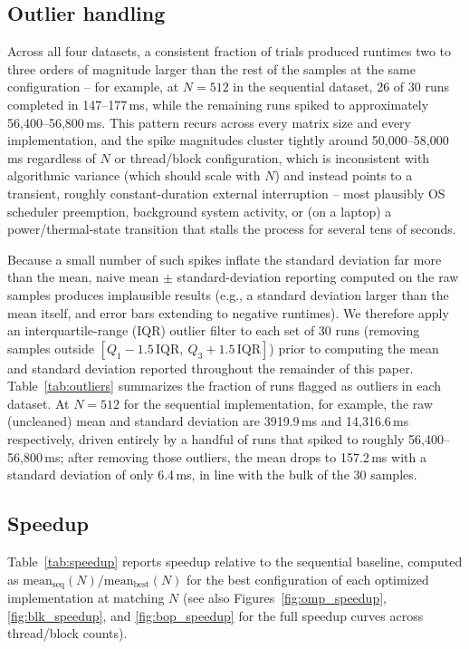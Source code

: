 \documentclass[11pt]{article}
\begin{document}
\subsection{Outlier handling}
\label{sec:outliers}

Across all four datasets, a consistent fraction of trials produced runtimes two to three orders of magnitude larger than the rest of the samples at the same configuration -- for example, at $N=512$ in the sequential dataset, 26 of 30 runs completed in 147--177\,ms, while the remaining runs spiked to approximately 56{,}400--56{,}800\,ms. This pattern recurs across every matrix size and every implementation, and the spike magnitudes cluster tightly around 50{,}000--58{,}000\,ms regardless of $N$ or thread/block configuration, which is inconsistent with algorithmic variance (which should scale with $N$) and instead points to a transient, roughly constant-duration external interruption -- most plausibly OS scheduler preemption, background system activity, or (on a laptop) a power/thermal-state transition that stalls the process for several tens of seconds.

Because a small number of such spikes inflate the standard deviation far more than the mean, naive mean $\pm$ standard-deviation reporting computed on the raw samples produces implausible results (e.g., a standard deviation larger than the mean itself, and error bars extending to negative runtimes). We therefore apply an interquartile-range (IQR) outlier filter to each set of 30 runs (removing samples outside $[Q_1 - 1.5\,\text{IQR},\ Q_3 + 1.5\,\text{IQR}]$) prior to computing the mean and standard deviation reported throughout the remainder of this paper. Table~\ref{tab:outliers} summarizes the fraction of runs flagged as outliers in each dataset. At $N=512$ for the sequential implementation, for example, the raw (uncleaned) mean and standard deviation are 3919.9\,ms and 14{,}316.6\,ms respectively, driven entirely by a handful of runs that spiked to roughly 56{,}400--56{,}800\,ms; after removing those outliers, the mean drops to 157.2\,ms with a standard deviation of only 6.4\,ms, in line with the bulk of the 30 samples.



\subsection{Speedup}
\label{sec:speedup}

Table~\ref{tab:speedup} reports speedup relative to the sequential baseline, computed as $\text{mean}_{\text{seq}}(N) / \text{mean}_{\text{best}}(N)$ for the best configuration of each optimized implementation at matching $N$ (see also Figures~\ref{fig:omp_speedup}, \ref{fig:blk_speedup}, and \ref{fig:bop_speedup} for the full speedup curves across thread/block counts).
\end{document}

